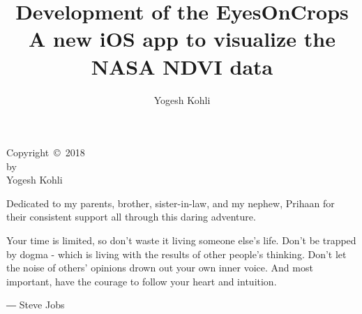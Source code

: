 \documentclass{sdsu-thesis}
\author{Yogesh Kohli}
\title{Development of the EyesOnCrops \\
A new iOS app to visualize the NASA NDVI data}
\theoremstyle{dtm}
\begin{document}
\maketitle

\makesignature

\begin{copyrightpage}
  Copyright~\copyright~2018 \\
  by \\
  Yogesh Kohli
\end{copyrightpage}

% 
\begin{dedication}
  \vspace{3in}
  \centering
  Dedicated to my parents, brother, sister-in-law, and my nephew, Prihaan for their consistent support all through this daring adventure.
\end{dedication}

% 
\begin{epigraph}
Your time is limited, so don't waste it living someone else's life. Don't be trapped by dogma - which is living with the results of other people's thinking. Don't let the noise of others' opinions drown out your own inner voice. And most important, have the courage to follow your heart and intuition.
\begin{center}
    ― Steve Jobs
\end{center}
\end{epigraph}

\begin{abstract}
  
\end{abstract}

\tableofcontents

\listoftables
\listoffigures
\end{document}
